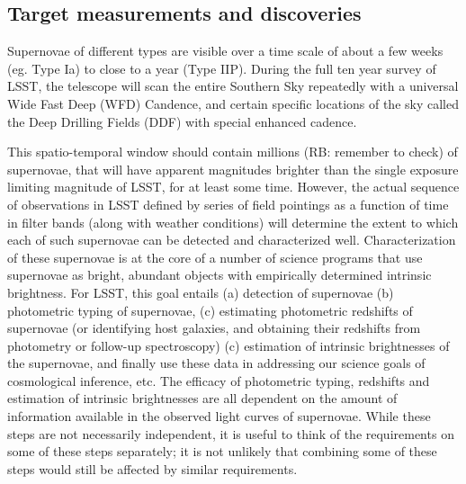 
\subsection{Target measurements and discoveries}
\label{sec:keyword:targets}


Supernovae of different types are visible over a time scale of about a few 
weeks (eg. Type Ia) to close to a year (Type IIP). During the full ten year
 survey of LSST, the telescope will scan the entire Southern Sky repeatedly
 with a universal Wide Fast Deep (WFD) Candence, and certain specific locations
of the sky called the Deep Drilling Fields (DDF) with special enhanced cadence. 

This spatio-temporal window should contain millions (RB: remember to check) of supernovae, that will have apparent magnitudes brighter than the single exposure limiting magnitude of LSST, for at least some time.  However, the actual
 sequence of observations in LSST defined by series of field pointings as a
 function of time in filter bands (along with weather conditions) will
 determine the extent to which each of such supernovae can be detected and
 characterized well.  Characterization of these supernovae is at the core of a
 number of science programs that use supernovae as bright, abundant objects with empirically determined intrinsic brightness. For LSST, this goal entails (a) detection of supernovae (b) photometric typing of supernovae, (c) estimating photometric redshifts of supernovae (or identifying host galaxies,
 and obtaining their redshifts from photometry or follow-up spectroscopy)
(c) estimation of intrinsic brightnesses of the supernovae, and finally use these data in addressing our science goals of cosmological inference, etc.
The efficacy of photometric typing, redshifts and estimation of intrinsic brightnesses are all
dependent on the amount of information available in the observed light curves of supernovae. While these steps are not necessarily independent, it is useful to think of the requirements on some of these steps separately; it is not unlikely  that combining some of these steps would still be affected by similar requirements. 

